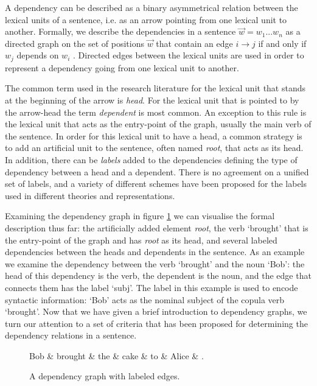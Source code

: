 A dependency can be described as a binary asymmetrical relation between the lexical units of a sentence, i.e. as an arrow pointing from one lexical unit to another. Formally, we describe the dependencies in a sentence $\vec{w} = w_1 ... w_n$ as a directed graph on the set of positions $\vec{w}$ that contain an edge $i \rightarrow j$ if and only if $w_j$ depends on $w_i$ \cite{Kuhl:10}. Directed edges between the lexical units are used in order to represent a dependency going from one lexical unit to another.

The common term used in the research literature for the lexical unit that stands at the beginning of the arrow is \textit{head}. For the lexical unit that is pointed to by the arrow-head the term \textit{dependent} is most common. An exception to this rule is the lexical unit that acts as the entry-point of the graph, usually the main verb of the sentence. In order for this lexical unit to have a head, a common strategy is to add an artificial unit to the sentence, often named \textit{root}, that acts as its head. In addition, there can be \textit{labels} added to the dependencies defining the type of dependency between a head and a dependent. There is no agreement on a unified set of labels, and a variety of different schemes have been proposed for the labels used in different theories and representations.

Examining the dependency graph in figure \ref{dep1} we can visualise the formal description thus far: the artificially added element \textit{root}, the verb `brought' that is the entry-point of the graph and has \textit{root} as its head, and several labeled dependencies between the heads and dependents in the sentence. As an example we examine the dependency between the verb `brought' and the noun `Bob': the head of this dependency is the verb, the dependent is the noun, and the edge that connects them has the label `subj'. The label in this example is used to encode syntactic information: `Bob' acts as the nominal subject of the copula verb `brought'. Now that we have given a brief introduction to dependency graphs, we turn our attention to a set of criteria that has been proposed for determining the dependency relations in a sentence.

\begin{figure}
    \begin{dependency}[]
        \begin{deptext}[column sep=1em, row sep=.1ex]
            Bob \& brought \& the \& cake \& to \& Alice \& . \\
        \end{deptext}
    \end{dependency}
    \caption{A dependency graph with labeled edges.}
    \label{dep1}
\end{figure}

